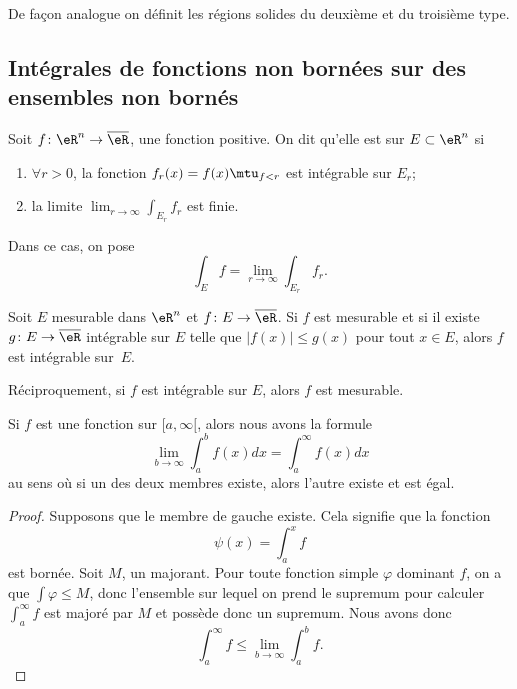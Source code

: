 De façon analogue on définit les régions solides du deuxième et du troisième type.  


					\subsection[Fonctions et ensembles non bornés]{Intégrales de fonctions non bornées sur des ensembles non bornés}

Soit $f\colon \eR^n\to \overline{ \eR }$, une fonction positive. On dit qu'elle est  sur $E\subset\eR^n$ si
\begin{enumerate}
    \item $\forall r>0$, la fonction $f_r(x)=f(x)\mtu_{f<r}$ est intégrable sur $E_r$;
\item la limite $\lim_{r\to\infty}\int_{E_r}f_r$ est finie.
\end{enumerate}
Dans ce cas, on pose 
\begin{equation}
	\int_Ef=\lim_{r\to\infty}\int_{E_r}f_r.
\end{equation}

\begin{theorem}[Page I.38]		\label{ThoFnTestIntnnBorn}
Soit $E$ mesurable dans $\eR^n$ et $f\colon E\to \overline{ \eR }$. Si $f$ est mesurable et si il existe $g\colon E\to \overline{ \eR }$ intégrable sur $E$ telle que $| f(x) |\leq g(x)$ pour tout $x\in E$, alors $f$ est intégrable sur~$E$.

Réciproquement, si $f$ est intégrable sur $E$, alors $f$ est mesurable.
\end{theorem}

\begin{lemma}\label{LemTHBSEs}
    Si \( f\) est une fonction sur \( \mathopen[ a , \infty [\), alors nous avons la formule
    \begin{equation}
        \lim_{b\to \infty}\int_a^bf(x)dx=\int_a^{\infty}f(x)dx
    \end{equation}
    au sens où si un des deux membres existe, alors l'autre existe et est égal.
\end{lemma}

\begin{proof}
    Supposons que le membre de gauche existe. Cela signifie que la fonction
    \begin{equation}
        \psi(x)=\int_a^xf
    \end{equation}
    est bornée. Soit \( M\), un majorant. Pour toute fonction simple \( \varphi\) dominant \( f\), on a que \( \int\varphi\leq M\), donc l'ensemble sur lequel on prend le supremum pour calculer \( \int_a^{\infty}f\) est majoré par \( M\) et possède donc un supremum. Nous avons donc
    \begin{equation}
        \int_a^{\infty}f\leq\lim_{b\to\infty}\int_a^bf.
    \end{equation}
\end{proof}

